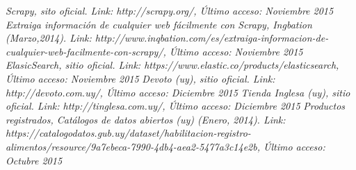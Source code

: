 \documentclass[12pt]{article} %
\begin{document}
\begin{thebibliography}{1}
 \textit{Scrapy, sito oficial. Link: http://scrapy.org/, Último acceso: Noviembre 2015}
 \textit{Extraiga información de cualquier web fácilmente con Scrapy, Ingbation (Marzo,2014). Link: http://www.inqbation.com/es/extraiga-informacion-de-cualquier-web-facilmente-con-scrapy/, Último acceso: Noviembre 2015}
 \textit{ElasicSearch, sitio oficial. Link: https://www.elastic.co/products/elasticsearch, Último acceso:  Noviembre 2015}
 \textit{Devoto (uy), sitio oficial. Link: http://devoto.com.uy/, Último acceso: Diciembre 2015}
 \textit{Tienda Inglesa (uy), sitio oficial. Link: http://tinglesa.com.uy/, Último acceso: Diciembre 2015}
 \textit{Productos registrados, Catálogos de datos abiertos (uy) (Enero, 2014). Link: https://catalogodatos.gub.uy/dataset/habilitacion-registro-alimentos/resource/9a7ebeca-7990-4db4-aea2-5477a3c14e2b, Último acceso: Octubre 2015}
\end{thebibliography}

\end{document}
